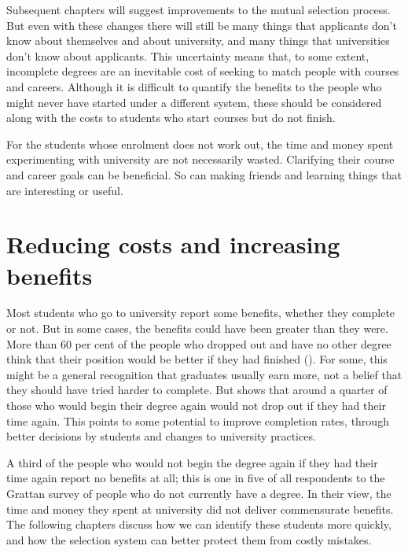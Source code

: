 Subsequent chapters will suggest improvements to the mutual selection process. But even with these changes there will still be many things that applicants don't know about themselves and about university, and many things that universities don't know about applicants. This uncertainty means that, to some extent, incomplete degrees are an inevitable cost of seeking to match people with courses and careers. Although it is difficult to quantify the benefits to the people who might never have started under a different system, these should be considered along with the costs to students who start courses but do not finish.

For the students whose enrolment does not work out, the time and money spent experimenting with university are not necessarily wasted. Clarifying their course and career goals can be beneficial. So can making friends and learning things that are interesting or useful.

\section{Reducing costs and increasing benefits}\label{sec:2.2}

Most students who go to university report some benefits, whether they complete or not. But in some cases, the benefits could have been greater than they were. More than 60 per cent of the people who dropped out and have no other degree think that their position would be better if they had finished (). For some, this might be a general recognition that graduates usually earn more, not a belief that they should have tried harder to complete. But  shows that around a quarter of those who would begin their degree again would not drop out if they had their time again. This points to some potential to improve completion rates, through better decisions by students and changes to university practices.

A third of the people who would not begin the degree again if they had their time again report no benefits at all; this is one in five of all respondents to the Grattan survey of people who do not currently have a degree. In their view, the time and money they spent at university did not deliver commensurate benefits. The following chapters discuss how we can identify these students more quickly, and how the selection system can better protect them from costly mistakes.


